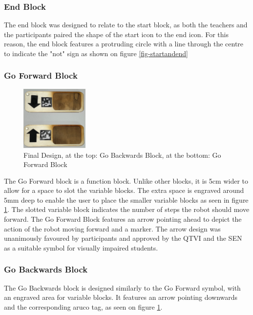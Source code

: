 \documentclass[oneside,%
                    author={Malak Hajji},
                    degree={BSc},
                    title={Designing An Accessible Ozobot Programming Platform for Students},
                  subtitle={With Mixed Visual Abilities}]{dissertation}
\begin{document}
\subsubsection{End Block}
The end block was designed to relate to the start block, as both the teachers and the participants paired the shape of the start icon to the end icon. For this reason, the end block features a protruding circle with a line through the centre to indicate the "not" sign as shown on figure \ref{fig-startandend}

\subsubsection{Go Forward Block}
\FloatBarrier
\begin{figure}[h]
    \centering
    \includegraphics[width=0.3\textwidth]{thesis/backandforth.eps}
    \caption{Final Design, at the top: Go Backwards  Block, at the bottom: Go Forward Block}
    \label{fig-gobackandforth}
\end{figure}
\FloatBarrier
The Go Forward block is a function block. Unlike other blocks, it is 5cm wider to allow for a space to slot the variable blocks. The extra space is engraved around 5mm deep to enable the user to place the smaller variable blocks as seen in figure \ref{fig-gobackandforth}. The slotted variable block indicates the number of steps the robot should move forward. The Go Forward Block features an arrow pointing ahead to depict the action of the robot moving forward and a marker. The arrow design was unanimously favoured by participants and approved by the QTVI and the SEN as a suitable symbol for visually impaired students. 

\subsubsection{Go Backwards Block}
The Go Backwards block is designed similarly to the Go Forward symbol, with an engraved area for variable blocks. It features an arrow pointing downwards and the corresponding aruco tag, as seen on figure \ref{fig-gobackandforth}.
\end{document}
